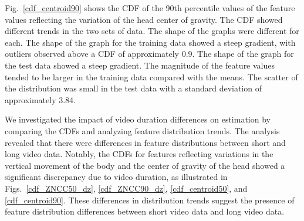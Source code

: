 %
Fig.~\ref{cdf_centroid90} shows the CDF of the 90th percentile values of the feature values reflecting the variation of the head center of gravity. 
% 
The CDF showed different trends in the two sets of data. 
% 
The shape of the graphs were different for each. 
% 
The shape of the graph for the training data showed a steep gradient, with outliers observed above a CDF of approximately 0.9.
% 
The shape of the graph for the test data showed a steep gradient. 
% 
The magnitude of the feature values tended to be larger in the training data compared with the means. 
% 
The scatter of the distribution was small in the test data with a standard deviation of approximately 3.84. 

%
We investigated the impact of video duration differences on estimation by comparing the CDFs and analyzing feature distribution trends.
%
The analysis revealed that there were differences in feature distributions between short and long video data.
%
Notably, the CDFs for features reflecting variations in the vertical movement of the body and the center of gravity of the head showed a significant discrepancy due to video duration, as illustrated in 
%
Figs.~\ref{cdf_ZNCC50_dz}, \ref{cdf_ZNCC90_dz}, \ref{cdf_centroid50}, and \ref{cdf_centroid90}.
%
These differences in distribution trends suggest the presence of feature distribution differences between short video data and long video data.